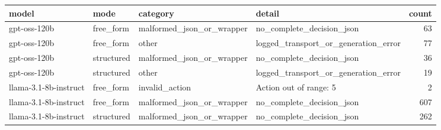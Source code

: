 \begin{tabular}{llllr}
\toprule
model & mode & category & detail & count \\
\midrule
gpt-oss-120b & free\_form & malformed\_json\_or\_wrapper & no\_complete\_decision\_json & 63 \\
gpt-oss-120b & free\_form & other & logged\_transport\_or\_generation\_error & 77 \\
gpt-oss-120b & structured & malformed\_json\_or\_wrapper & no\_complete\_decision\_json & 36 \\
gpt-oss-120b & structured & other & logged\_transport\_or\_generation\_error & 19 \\
llama-3.1-8b-instruct & free\_form & invalid\_action & Action out of range: 5 & 2 \\
llama-3.1-8b-instruct & free\_form & malformed\_json\_or\_wrapper & no\_complete\_decision\_json & 607 \\
llama-3.1-8b-instruct & structured & malformed\_json\_or\_wrapper & no\_complete\_decision\_json & 262 \\
\bottomrule
\end{tabular}
